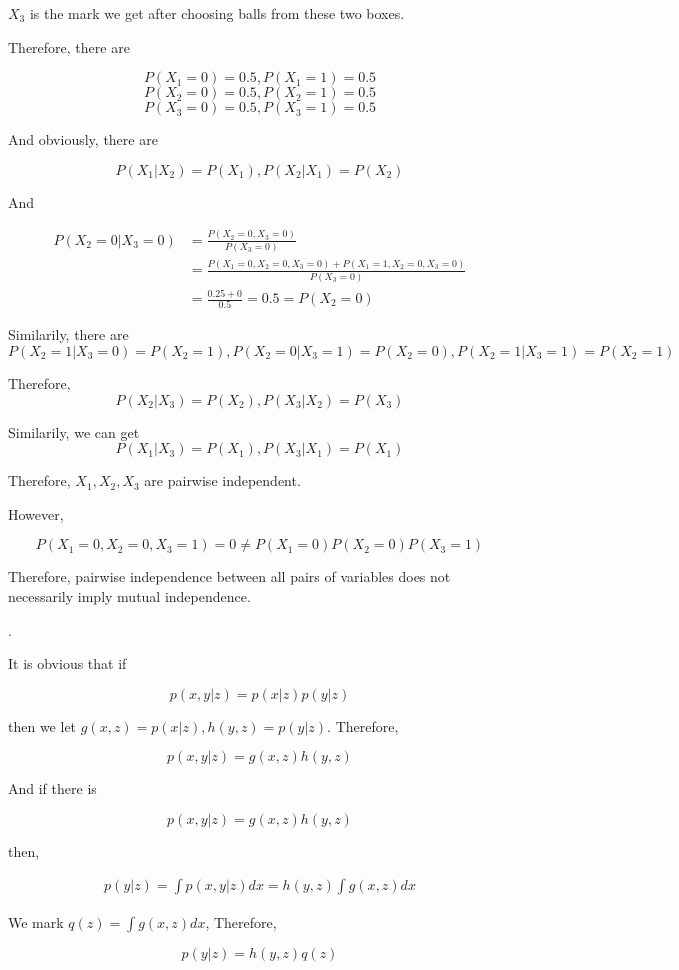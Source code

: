 \documentclass[UTF8]{article}
\begin{document}
$X_3$ is the mark we get after choosing balls from these two boxes.

Therefore, there are

$$P(X_1 = 0) = 0.5, P(X_1 = 1) = 0.5$$
$$P(X_2 = 0) = 0.5, P(X_2 = 1) = 0.5$$
$$P(X_3 = 0) = 0.5, P(X_3 = 1) = 0.5$$

And obviously, there are

$$P(X_1 | X_2) = P(X_1), P(X_2 | X_1) = P(X_2)$$

And

\begin{align*}
    P(X_2 = 0 | X_3 = 0) &= \frac{P(X_2 = 0, X_3 = 0)}{P(X_3 = 0)}\\
    &= \frac{P(X_1 = 0, X_2 = 0, X_3 = 0)+P(X_1 = 1, X_2=0, X_3 = 0)}{P(X_3 = 0)}\\
    &= \frac{0.25 + 0}{0.5} = 0.5 = P(X_2 = 0)
\end{align*}

Similarily, there are
$$P(X_2 = 1 | X_3 = 0) =P(X_2 = 1),  P(X_2 = 0 | X_3 = 1) =P(X_2 = 0), P(X_2 = 1 | X_3 = 1) =P(X_2 = 1)$$

Therefore,
$$P(X_2 | X_3) = P(X_2), P(X_3 | X_2) = P(X_3)$$

Similarily, we can get
$$P(X_1 | X_3) = P(X_1), P(X_3 | X_1) = P(X_1)$$

Therefore, $X_1, X_2, X_3$ are pairwise independent.

However,

$$P(X_1 = 0, X_2 = 0, X_3 = 1) = 0 \neq P(X_1 = 0)P(X_2 = 0)P(X_3 = 1)$$

Therefore, pairwise independence between all pairs of variables does not necessarily imply mutual independence.

.

It is obvious that if

$$p(x,y|z)=p(x|z)p(y|z)$$

then we let $g(x,z)=p(x|z), h(y,z)=p(y|z)$. Therefore, 

$$p(x,y|z)=g(x,z)h(y,z)$$

And if there is

$$p(x,y|z)=g(x,z)h(y,z)$$

then,

\begin{align*}
    p(y|z) = \int p(x,y|z)dx = h(y,z)\int g(x,z)dx
\end{align*}

We mark $q(z) = \int g(x,z)dx$, Therefore,

$$p(y|z) = h(y,z)q(z)$$
\end{document}
